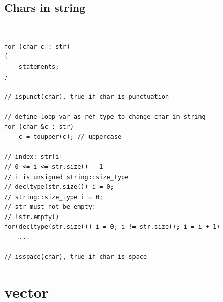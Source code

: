 \documentclass{article}
\begin{document}
\subsection{Chars in string}
\begin{definition}~
    \begin{verbatim}
for (char c : str)
{
    statements;
}

// ispunct(char), true if char is punctuation

// define loop var as ref type to change char in string
for (char &c : str)
    c = toupper(c); // uppercase

// index: str[i]
// 0 <= i <= str.size() - 1
// i is unsigned string::size_type
// decltype(str.size()) i = 0;
// string::size_type i = 0;
// str must not be empty:
// !str.empty()
for(decltype(str.size()) i = 0; i != str.size(); i = i + 1)
    ...

// isspace(char), true if char is space
\end{verbatim}
\end{definition}

\section{vector}

\printbibliography
\end{document}
